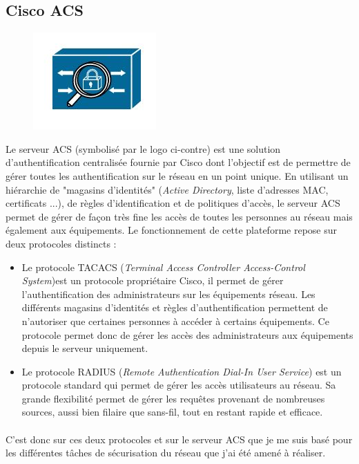 \documentclass[a4paper,12pt]{report}
\begin{document}
\subsection{Cisco ACS}
\begin{figure}
\centering
\includegraphics[scale=1]{../rapport_photos/acs_logo.JPG} 
\end{figure}
Le serveur ACS (symbolisé par le logo ci-contre)  est une solution d'authentification centralisée fournie par Cisco dont l'objectif est de permettre de gérer toutes les authentification sur le réseau en un point unique. En utilisant un hiérarchie de "magasins d'identités" (\textit{Active Directory}, liste d'adresses MAC, certificats ...), de règles d'identification et de politiques d'accès, le serveur ACS permet de gérer de façon très fine les accès de toutes les personnes au réseau mais également aux équipements. Le fonctionnement de cette plateforme repose sur deux protocoles distincts :
\begin{itemize}
\item
Le protocole TACACS (\textit{Terminal Access Controller Access-Control System})est un protocole propriétaire Cisco, il permet de gérer l'authentification des administrateurs sur les équipements réseau. Les différents magasins d'identités et règles d'authentification permettent de n'autoriser que certaines personnes à accéder à certains équipements. Ce protocole permet donc de gérer les accès des administrateurs aux équipements depuis le serveur uniquement.
\item
Le protocole RADIUS (\textit{Remote Authentication Dial-In User Service}) est un protocole standard qui permet de gérer les accès utilisateurs au réseau. Sa grande flexibilité permet de gérer les requêtes provenant de nombreuses sources, aussi bien filaire que sans-fil, tout en restant rapide et efficace.
\end{itemize}
\paragraph{}
C'est donc sur ces deux protocoles et sur le serveur ACS que je me suis basé pour les différentes tâches de sécurisation du réseau que j'ai été amené à réaliser.
\end{document}
